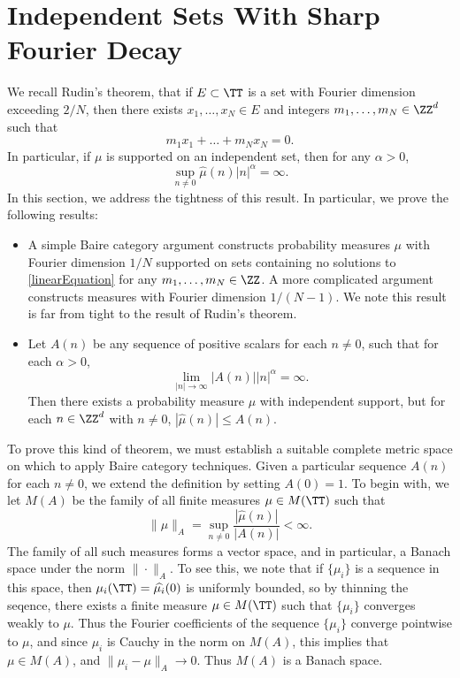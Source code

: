 \section{Independent Sets With Sharp Fourier Decay}

We recall Rudin's theorem, that if $E \subset \TT$ is a set with Fourier dimension exceeding $2/N$, then there exists $x_1, \dots, x_N \in E$ and integers $m_1, \dots, m_N \in \ZZ^d$ such that
%
\begin{equation} \label{linearEquation}
	m_1 x_1 + \dots + m_N x_N = 0.
\end{equation}
%
In particular, if $\mu$ is supported on an independent set, then for any $\alpha > 0$,
%
\[ \sup_{n \neq 0} \widehat{\mu}(n) |n|^\alpha = \infty. \]
%
In this section, we address the tightness of this result. In particular, we prove the following results:
%
\begin{itemize}
	\item A simple Baire category argument constructs probability measures $\mu$ with Fourier dimension $1/N$ supported on sets containing no solutions to \eqref{linearEquation} for any $m_1, \dots, m_N \in \ZZ$. A more complicated argument constructs measures with Fourier dimension $1/(N-1)$. We note this result is far from tight to the result of Rudin's theorem.

	\item Let $A(n)$ be any sequence of positive scalars for each $n \neq 0$, such that for each $\alpha > 0$,
	\[ \lim_{|n| \to \infty} |A(n)| |n|^\alpha = \infty. \]
	Then there exists a probability measure $\mu$ with independent support, but for each $n \in \ZZ^d$ with $n \neq 0$, $|\widehat{\mu}(n)| \leq A(n)$.
\end{itemize}

To prove this kind of theorem, we must establish a suitable complete metric space on which to apply Baire category techniques. Given a particular sequence $A(n)$ for each $n \neq 0$, we extend the definition by setting $A(0) = 1$. To begin with, we let $M(A)$ be the family of all finite measures $\mu \in M(\TT)$ such that
%
\[ \| \mu \|_A = \sup_{n \neq 0} \frac{|\widehat{\mu}(n)|}{|A(n)|} < \infty. \]
%
The family of all such measures forms a vector space, and in particular, a Banach space under the norm $\| \cdot \|_A$. To see this, we note that if $\{ \mu_i \}$ is a sequence in this space, then $\mu_i(\TT) = \widehat{\mu_i}(0)$ is uniformly bounded, so by thinning the seqence, there exists a finite measure $\mu \in M(\TT)$ such that $\{ \mu_i \}$ converges weakly to $\mu$. Thus the Fourier coefficients of the sequence $\{ \mu_i \}$ converge pointwise to $\mu$, and since $\mu_i$ is Cauchy in the norm on $M(A)$, this implies that $\mu \in M(A)$, and $\| \mu_i - \mu \|_A \to 0$. Thus $M(A)$ is a Banach space.

